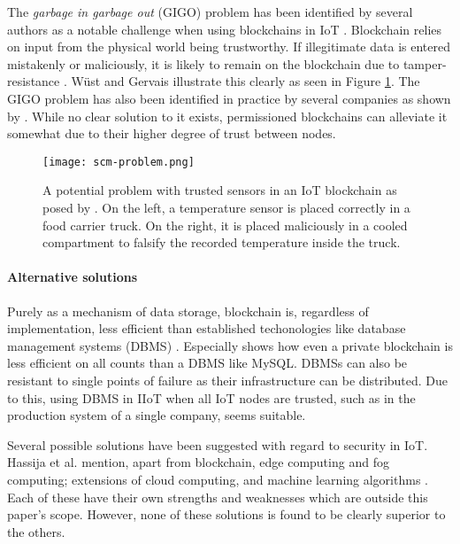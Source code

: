 The \textit{garbage in garbage out} (GIGO) problem has been identified
by several authors as a notable challenge when using blockchains in IoT
\cite{babichDistributed,reynaIntegration,wustBlockchainNeed}.
Blockchain relies on input from the physical world being trustworthy.
If illegitimate data is entered mistakenly or maliciously, it is
likely to remain on the blockchain due to tamper-resistance
\cite{olearyConfiguring}. Wüst and Gervais \cite{wustBlockchainNeed}
illustrate this clearly as seen in Figure \ref{fig:scm-problem}. The
GIGO problem has also been identified in practice by several companies
as shown by \cite{rogersonFood}. While no clear solution to it exists,
permissioned blockchains can alleviate it somewhat due to their higher
degree of trust between nodes.

\begin{figure}
  \texttt{[image: scm-problem.png]}
  \caption{A potential problem with trusted sensors in an IoT
  blockchain as posed by \cite{wustBlockchainNeed}. On the left, a
  temperature sensor is placed correctly in a food carrier truck. On
  the right, it is placed maliciously in a cooled compartment to
  falsify the recorded temperature inside the truck.}
  \label{fig:scm-problem}
\end{figure}


\paragraph{Alternative solutions} Purely as a mechanism of data
storage, blockchain is, regardless of implementation, less efficient
than established techonologies like database management systems (DBMS)
\cite{stolfiNISTReview,wustBlockchainNeed}. Especially
\cite{chenComparative} shows how even a private blockchain is less
efficient on all counts than a DBMS like MySQL. DBMSs can also be
resistant to single points of failure as their infrastructure can be
distributed. Due to this, using DBMS in IIoT when all IoT nodes are
trusted, such as in the production system of a single company, seems
suitable.

Several possible solutions have been suggested with regard to security
in IoT. Hassija et al. mention, apart from blockchain, edge computing
and fog computing; extensions of cloud computing, and machine learning
algorithms \cite{hassijaSurvey}. Each of these have their own
strengths and weaknesses which are outside this paper's scope.
However, none of these solutions is found to be clearly superior to
the others.

